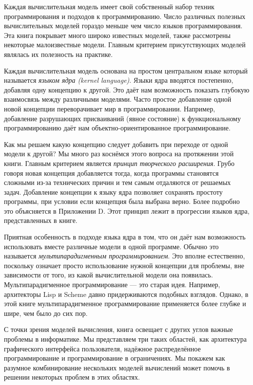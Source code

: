 Каждая вычислительная модель имеет свой собственный набор техник программирования и подходов к программированию. Число различных полезных вычислительных моделей гораздо меньше чем число языков программирования. Эта книга покрывает много широко известных моделей, также рассмотрены некоторые малоизвестные модели. Главным критерием присутствующих моделей являлась их полезность на практике.

Каждая вычислительная модель основана на простом центральном языке который называется \emph{языком ядра (kernel language)}. Языки ядра вводятся постепенно, добавляя одну концепцию к другой. Это даёт нам возможность показать глубокую взаимосвязь между различными моделями. Часто простое добавление одной новой концепции переворачивает мир в программировании. Например, добавление разрушающих присваиваний (явное состояние) к функциональному программированию даёт нам объектно-ориентированное программирование.

Как мы решаем какую концепцию следует добавить при переходе от одной модели к другой? Мы много раз коснёмся этого вопроса на протяжении этой книги. Главным критерием является \emph{принцип творческого расширения}. Грубо говоря новая концепция добавляется тогда, когда программы становятся сложными из-за технических причин и тем самым отдаляются от решаемых задач. Добавление концепции к языку ядра позволяет сохранять простоту программы, при условии если концепция была выбрана верно. Более подробно это объясняется в Приложении D. Этот принцип лежит в прогрессии языков ядра, представленных в книге.

Приятная особенность в подходе языка ядра в том, что он даёт нам возможность использовать вместе различные модели в одной программе. Обычно это называется \emph{мультипарадигменным программированием}. Это вполне естественно, поскольку означает просто использование нужной концепции для проблемы, вне зависимости от того, из какой вычислительной модели она появилась. Мультипарадигменное программирование --- это старая идея. Например, архитекторы Lisp и Scheme давно придерживаются подобных взглядов. Однако, в этой книге мультипарадигменное программирование применяется более глубже и шире, чем было до сих пор.

С точки зрения моделей вычисления, книга освещает с других углов важные проблемы в информатике. Мы представляем три таких областей, как архитектура графического интерфейса пользователя, надёжное распределённое программирование и программирование в ограничениях. Мы покажем как разумное комбинирование нескольких моделей вычислений может помочь в решении некоторых проблем в этих областях.

